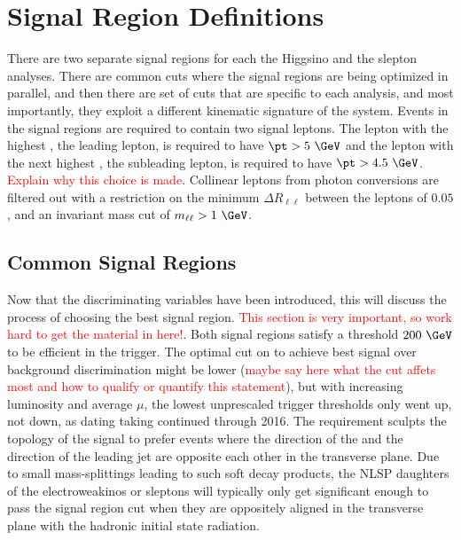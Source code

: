 \section{Signal Region Definitions}
\label{sec:sr:srdef}
 There are two separate signal regions for each the Higgsino and the slepton analyses.  There are common cuts where the signal regions are being optimized in parallel, and then there are set of cuts that are specific to each analysis, and most importantly, they exploit a different kinematic signature of the system.  Events in the signal regions are required to contain two signal leptons.  The lepton with the highest \pt, the leading lepton, is required to have $\pt > 5~\GeV$ and the lepton with the next highest \pt, the subleading lepton, is required to have $\pt > 4.5~\GeV$.  \textcolor{red}{Explain why this choice is made}.  Collinear leptons from photon conversions are filtered out with a restriction on the minimum $\Delta R_{\ell\ell}$ between the leptons of $0.05$, and an invariant mass cut of $m_{\ell\ell} > 1 ~\GeV$.
\subsection{Common Signal Regions}
\label{sec:sr:commom}
Now that the discriminating variables have been introduced, this will discuss the process of choosing the best signal region.  \textcolor{red}{This section is very important, so work hard to get the material in here!}. Both signal regions satisfy a \met{} threshold $200~\GeV$ \met{} to be efficient in the \met{} trigger.  The optimal cut on \met{} to achieve best signal over background discrimination might be lower (\textcolor{red}{maybe say here what the \met{} cut affets most and how to qualify or quantify this statement}), but with increasing luminosity and average $\mu$, the lowest unprescaled \met{} trigger thresholds only went up, not down, as dating taking continued through 2016.  The \met{} requirement sculpts the topology of the signal to prefer events where the direction of the \met and the direction of the leading jet are opposite each other in the transverse plane.  Due to small mass-splittings leading to such soft decay products, the NLSP daughters of the electroweakinos or sleptons will typically only get significant enough \met{} to pass the \met{} signal region cut when they are oppositely aligned in the transverse plane with the hadronic initial state radiation.  

